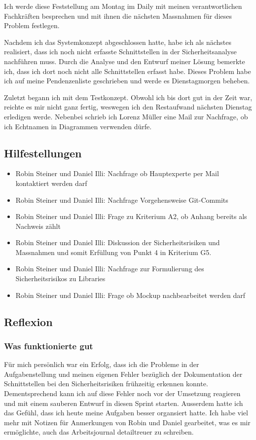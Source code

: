 Ich werde diese Feststellung am Montag im Daily mit meinen verantwortlichen Fachkräften besprechen und mit ihnen die nächsten Massnahmen für dieses Problem festlegen.

Nachdem ich das Systemkonzept abgeschlossen hatte, habe ich als nächstes realisiert, dass ich noch nicht erfasste Schnittstellen in der Sicherheitsanalyse nachführen muss.
Durch die Analyse und den Entwurf meiner Lösung bemerkte ich, dass ich dort noch nicht alle Schnittstellen erfasst habe. Dieses Problem habe ich auf meine Pendenzenliste geschrieben
und werde es Dienstagmorgen beheben.

Zuletzt begann ich mit dem Testkonzept. Obwohl ich bis dort gut in der Zeit war, reichte es mir nicht ganz fertig, weswegen ich den Restaufwand nächsten Dienstag erledigen werde.
Nebenbei schrieb ich Lorenz Müller eine Mail zur Nachfrage, ob ich Echtnamen in Diagrammen verwenden dürfe.

\subsection*{Hilfestellungen}
\begin{itemize}
    \item Robin Steiner und Daniel Illi: Nachfrage ob Hauptexperte per Mail kontaktiert werden darf
    \item Robin Steiner und Daniel Illi: Nachfrage Vorgehensweise Git-Commits
    \item Robin Steiner und Daniel Illi: Frage zu Kriterium A2, ob Anhang bereits als Nachweis zählt
    \item Robin Steiner und Daniel Illi: Diskussion der Sicherheitsrisiken und Massnahmen und somit Erfüllung von Punkt 4 in Kriterium G5.
    \item Robin Steiner und Daniel Illi: Nachfrage zur Formulierung des Sicherheitsrisikos zu Libraries
    \item Robin Steiner und Daniel Illi: Frage ob Mockup nachbearbeitet werden darf
\end{itemize}

\subsection*{Reflexion}

\subsubsection*{Was funktionierte gut}
Für mich persönlich war ein Erfolg, dass ich die Probleme in der Aufgabenstellung und meinen eigenen Fehler bezüglich der Dokumentation der Schnittstellen
bei den Sicherheitsrisiken frühzeitig erkennen konnte. Dementsprechend kann ich auf diese Fehler noch vor der Umsetzung reagieren und mit einem sauberen Entwurf in diesen Sprint
starten. Ausserdem hatte ich das Gefühl, dass ich heute meine Aufgaben besser organsiert hatte. Ich habe viel mehr mit Notizen für Anmerkungen von Robin und Daniel gearbeitet,
was es mir ermöglichte, auch das Arbeitsjournal detailtreuer zu schreiben.

